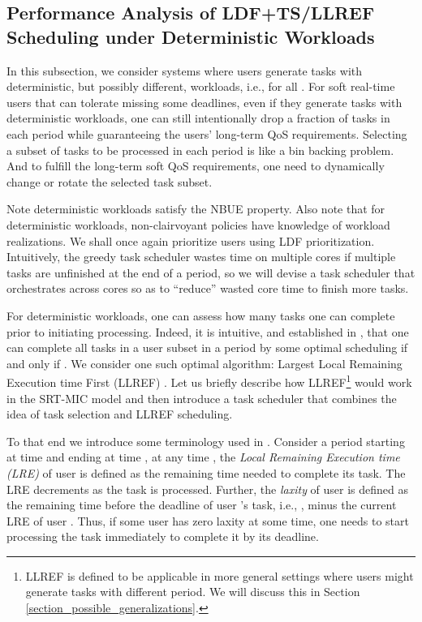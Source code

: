 \documentclass[prodmode,acmtompecs]{acmsmall}
\begin{document}
\subsection{Performance Analysis of LDF+TS/LLREF Scheduling under Deterministic Workloads}
\label{subsection_LDF_TS_LLREF}
In this subsection, we consider systems where users generate tasks with deterministic, but possibly different, workloads, i.e.,  for all . 
For soft real-time users that can tolerate missing some deadlines, even if they generate tasks with deterministic workloads, one can still intentionally drop a fraction of tasks in each period while guaranteeing the users' long-term QoS requirements. 
Selecting a subset of tasks to be processed in each period is like a bin backing problem. And to fulfill the long-term soft QoS requirements, one need to dynamically change or rotate the selected task subset. 


Note deterministic workloads satisfy the NBUE property. Also note that for deterministic workloads, non-clairvoyant policies have knowledge of workload realizations. 
We shall once again prioritize users using LDF prioritization. 
Intuitively, the greedy task scheduler wastes time on multiple cores if multiple tasks are unfinished at the end of a period, so we will devise a task scheduler that orchestrates across cores so as to ``reduce'' wasted core time to finish more tasks. 

For deterministic workloads, one can assess how many tasks one can complete prior to initiating processing. 
Indeed, it is intuitive, and established in \cite{CRJ06}, that one can complete all tasks in a user subset  in a period by some optimal scheduling if and only if . We consider one such optimal algorithm: Largest Local Remaining Execution time First (LLREF) \cite{CRJ06}. Let us briefly describe how LLREF\footnote{LLREF is defined to be applicable in more general settings where users might generate tasks with different period. We will discuss this in Section \ref{section_possible_generalizations}. } would work in the SRT-MIC model and then introduce a task scheduler that combines the idea of task selection and LLREF scheduling. 

To that end we introduce some terminology used in \cite{CRJ06}. Consider a period starting at time  and ending at time  , at any time , the {\em Local Remaining Execution time (LRE)} of user  is defined as the remaining time needed to complete its task. The LRE decrements as the task is processed. 
Further, the {\em laxity} of user  is defined as the remaining time before the deadline of user 's task, i.e., , minus the current LRE of user . Thus, if some user has zero laxity at some time, one needs to start processing the task immediately to complete it by its deadline. 
\end{document}
